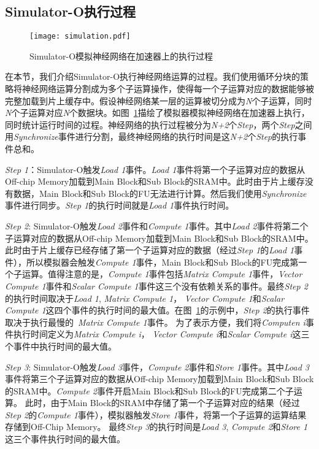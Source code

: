 \subsection{Simulator-O执行过程}

\begin{figure}[h]
\centering
\texttt{[image: simulation.pdf]}
\caption{Simulator-O模拟神经网络在加速器上的执行过程}
\label{fig:simulation}
\end{figure}

在本节，我们介绍Simulator-O执行神经网络运算的过程。我们使用循环分块的策略将神经网络运算分割成为多个子运算操作，使得每一个子运算对应的数据能够被完整加载到片上缓存中。假设神经网络某一层的运算被切分成为\emph{N}个子运算，同时\emph{N}个子运算对应\emph{N}个数据块。如图~\ref{fig:simulation}描绘了模拟器模拟神经网络在加速器上执行，同时统计运行时间的过程。神经网络的执行过程被分为\emph{N+2}个\emph{Step}，两个\emph{Step}之间用\emph{Synchronize}事件进行分割，最终神经网络的执行时间是这\emph{N+2}个\emph{Step}的执行事件总和。

\emph{Step 1}：Simulator-O触发\emph{Load 1}事件。\emph{Load 1}事件将第一个子运算对应的数据从Off-chip Memory加载到Main Block和Sub Block的SRAM中。此时由于片上缓存没有数据，Main Block和Sub Block的FU无法进行计算。然后我们使用\emph{Synchronize}事件进行同步。\emph{Step 1}的执行时间就是\emph{Load 1}事件执行时间。

\emph{Step 2}: Simulator-O触发\emph{Load 2}事件和\emph{Compute 1}事件。其中\emph{Load 2}事件将第二个子运算对应的数据从Off-chip Memory加载到Main Block和Sub Block的SRAM中。此时由于片上缓存已经存储了第一个子运算对应的数据（经过\emph{Step 1}的\emph{Load 1}事件），所以模拟器会触发\emph{Compute 1}事件，Main Block和Sub Block的FU完成第一个子运算。值得注意的是，\emph{Compute 1}事件包括\emph{Matrix Compute 1}事件，\emph{Vector Compute 1}事件和\emph{Scalar Compute 1}事件这三个没有依赖关系的事件。最终\emph{Step 2}的执行时间取决于\emph{Load 1}, \emph{Matrix Compute 1}， \emph{Vector Compute 1}和\emph{Scalar Compute 1}这四个事件的执行时间的最大值。在图~\ref{fig:simulation}的示例中，\emph{Step 2}的执行事件取决于执行最慢的~\emph{Matrix Compute 1}事件。
为了表示方便，我们将\emph{Computen i}事件执行时间定义为\emph{Matrix Compute i}， \emph{Vector Compute i}和\emph{Scalar Compute i}这三个事件中执行时间的最大值。

\emph{Step 3}: Simulator-O触发\emph{Load 3}事件，\emph{Compute 2}事件和\emph{Store 1}事件。其中\emph{Load 3}事件将第三个子运算对应的数据从Off-chip Memory加载到Main Block和Sub Block的SRAM中。\emph{Compute 2}事件开启Main Block和Sub Block的FU完成第二个子运算。 此时，由于Main Block的SRAM中存储了第一个子运算对应的结果（经过\emph{Step 2}的\emph{Compute 1}事件），模拟器触发\emph{Store 1}事件，将第一个子运算的运算结果存储到Off-Chip Memory。
最终\emph{Step 3}的执行时间是\emph{Load 3}, \emph{Compute 2}和\emph{Store 1}这三个事件执行时间的最大值。

